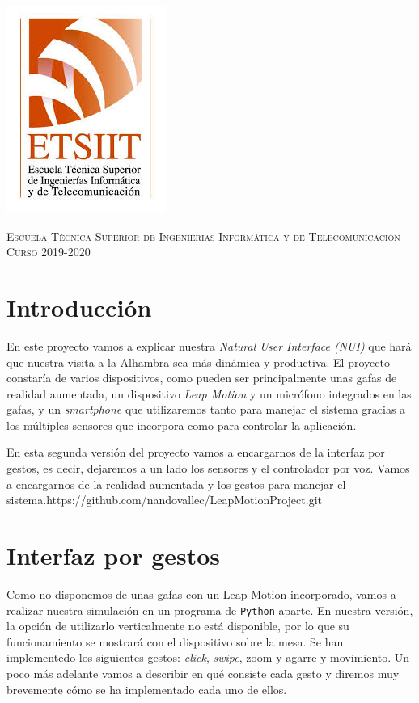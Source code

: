 \documentclass[11pt,a4paper]{article}
\begin{document}
\begin{titlepage}
\begin{minipage}{\textwidth}
\includegraphics[scale=0.3]{img/etsiit.jpeg}

\vspace{0.5cm}
\textsc{Escuela Técnica Superior de Ingenierías Informática y de Telecomunicación}\\
\vspace{0.5cm}
\textsc{Curso 2019-2020}
\end{minipage}
\end{titlepage}

\tableofcontents
\thispagestyle{empty}				%

\newpage

\setlength{\parskip}{1em}


\section{Introducción}
En este proyecto vamos a explicar nuestra \textit{Natural User Interface (NUI)} que hará que nuestra visita a la Alhambra sea más
dinámica y productiva. El proyecto constaría de varios dispositivos, como pueden ser principalmente unas gafas de realidad aumentada,
un dispositivo \textit{Leap Motion} y un micrófono integrados en las gafas, y un \textit{smartphone} que utilizaremos tanto para
manejar el sistema gracias a los múltiples sensores que incorpora como para controlar la aplicación.

En esta segunda versión del proyecto vamos a encargarnos de la interfaz por gestos, es decir, dejaremos a un lado los sensores
y el controlador por voz. Vamos a encargarnos de la realidad aumentada y los gestos para manejar el sistema.https://github.com/nandovallec/LeapMotionProject.git

\section{Interfaz por gestos}
Como no disponemos de unas gafas con un Leap Motion incorporado, vamos a realizar nuestra simulación en un programa de \texttt{Python} aparte. En
nuestra versión, la opción de utilizarlo verticalmente no está disponible, por lo que su funcionamiento se mostrará con el dispositivo
sobre la mesa. Se han implementedo los siguientes gestos: \textit{click}, \textit{swipe}, zoom y agarre y movimiento. Un
poco más adelante vamos a describir en qué consiste cada gesto y diremos muy brevemente cómo se ha
implementado cada uno de ellos.
\end{document}
